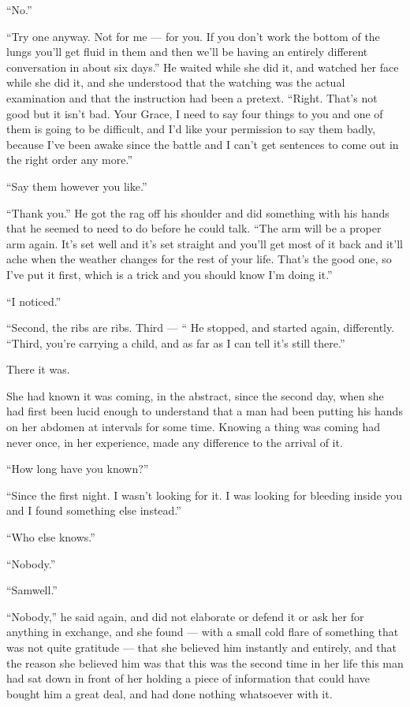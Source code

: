 “No.”

“Try one anyway. Not for me — for you. If you don’t work the bottom of the lungs you’ll get fluid in them and then we’ll be having an entirely different conversation in about six days.” He waited while she did it, and watched her face while she did it, and she understood that the watching was the actual examination and that the instruction had been a pretext. “Right. That’s not good but it isn’t bad. Your Grace, I need to say four things to you and one of them is going to be difficult, and I’d like your permission to say them badly, because I’ve been awake since the battle and I can’t get sentences to come out in the right order any more.”

“Say them however you like.”

“Thank you.” He got the rag off his shoulder and did something with his hands that he seemed to need to do before he could talk. “The arm will be a proper arm again. It’s set well and it’s set straight and you’ll get most of it back and it’ll ache when the weather changes for the rest of your life. That’s the good one, so I’ve put it first, which is a trick and you should know I’m doing it.”

“I noticed.”

“Second, the ribs are ribs. Third — “ He stopped, and started again, differently. “Third, you’re carrying a child, and as far as I can tell it’s still there.”

There it was.

She had known it was coming, in the abstract, since the second day, when she had first been lucid enough to understand that a man had been putting his hands on her abdomen at intervals for some time. Knowing a thing was coming had never once, in her experience, made any difference to the arrival of it.

“How long have you known?”

“Since the first night. I wasn’t looking for it. I was looking for bleeding inside you and I found something else instead.”

“Who else knows.”

“Nobody.”

“Samwell.”

“Nobody,” he said again, and did not elaborate or defend it or ask her for anything in exchange, and she found — with a small cold flare of something that was not quite gratitude — that she believed him instantly and entirely, and that the reason she believed him was that this was the second time in her life this man had sat down in front of her holding a piece of information that could have bought him a great deal, and had done nothing whatsoever with it.

